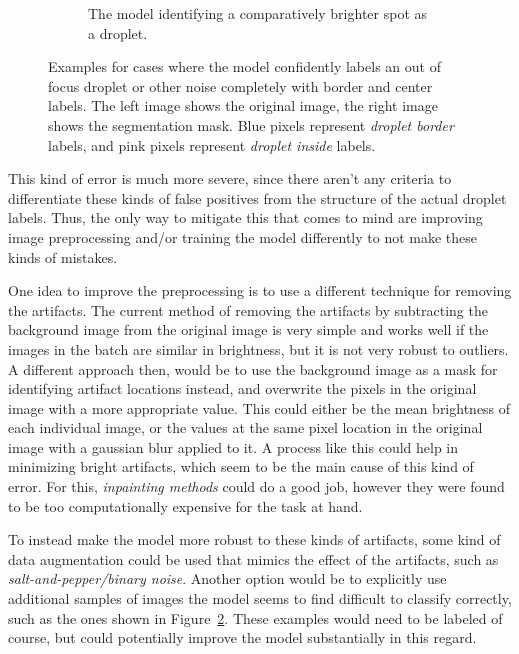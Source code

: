\begin{figure}[htbp]
\begin{subfigure}{\textwidth}
{\begin{tabular}{ll}
            \end{tabular}
        }
        \caption{The model identifying a comparatively brighter spot as a droplet.}
        \label{fig:totally_wrong_b}
    \end{subfigure}
    \vspace{0.2cm}
    \caption{Examples for cases where the model confidently labels an out of focus droplet or other noise completely with border and center labels. The left image shows the original image, the right image shows the segmentation mask. Blue pixels represent \emph{droplet border} labels, and pink pixels represent \emph{droplet inside} labels.}
    \label{fig:totally_wrong}
\end{figure}

This kind of error is much more severe, since there aren't any criteria to differentiate these kinds of false positives from the structure of the actual droplet labels.
Thus, the only way to mitigate this that comes to mind are improving image preprocessing and/or training the model differently to not make these kinds of mistakes.

One idea to improve the preprocessing is to use a different technique for removing the artifacts. 
The current method of removing the artifacts by subtracting the background image from the original image is very simple and works well if the images in the batch are similar in brightness, but it is not very robust to outliers.
A different approach then, would be to use the background image as a mask for identifying artifact locations instead, and overwrite the pixels in the original image with a more appropriate value. 
This could either be the mean brightness of each individual image, or the values at the same pixel location in the original image with a gaussian blur applied to it.
A process like this could help in minimizing bright artifacts, which seem to be the main cause of this kind of error.
For this, \emph{inpainting methods} \cite{OpenCVImageInpainting,teleaImageInpaintingTechnique2004,bertalmioNavierstokesFluidDynamics2001} could do a good job, however they were found to be too computationally expensive for the task at hand.

To instead make the model more robust to these kinds of artifacts, some kind of data augmentation could be used that mimics the effect of the artifacts, such as \emph{salt-and-pepper/binary noise}. Another option would be to explicitly use additional samples of images the model seems to find difficult to classify correctly, such as the ones shown in Figure~\ref{fig:totally_wrong}. These examples would need to be labeled of course, but could potentially improve the model substantially in this regard.

